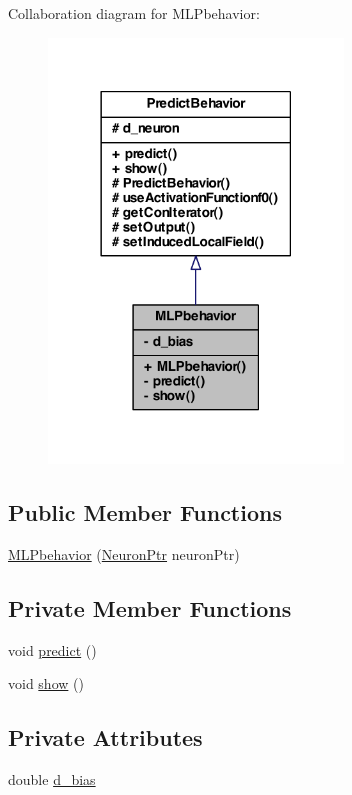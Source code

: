 Collaboration diagram for MLPbehavior:\nopagebreak
\begin{figure}[H]
\begin{center}
\leavevmode
\includegraphics[width=222pt]{class_m_l_pbehavior__coll__graph}
\end{center}
\end{figure}
\subsection*{Public Member Functions}
\begin{DoxyCompactItemize}
\item 
\hyperlink{class_m_l_pbehavior_a6e42077295843dd0d9e52f2776f4309e}{MLPbehavior} (\hyperlink{_a_m_o_r_e_8h_ac1ea936c2c7728eb382278131652fef4}{NeuronPtr} neuronPtr)
\end{DoxyCompactItemize}
\subsection*{Private Member Functions}
\begin{DoxyCompactItemize}
\item 
void \hyperlink{class_m_l_pbehavior_aaff94adc3577cda9e48d8da925b0ffbf}{predict} ()
\item 
void \hyperlink{class_m_l_pbehavior_a32aa885e07e8f4eb33e05afb46040567}{show} ()
\end{DoxyCompactItemize}
\subsection*{Private Attributes}
\begin{DoxyCompactItemize}
\item 
double \hyperlink{class_m_l_pbehavior_a6206785c5c3f838a0538f9f77fa7a25a}{d\_\-bias}
\end{DoxyCompactItemize}
